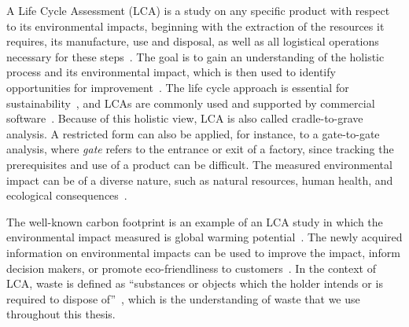     
    A Life Cycle Assessment (LCA) is a study on any specific product with respect to its environmental impacts, beginning with the extraction of the resources it requires, its manufacture, use and disposal, as well as all logistical operations necessary for these steps~\autocite{bjorn2018}.
The goal is to gain an understanding of the holistic process and its environmental impact, which is then used to identify opportunities for improvement~\autocite{graves2025}.
The life cycle approach is essential for sustainability~\autocite{graves2025}, and LCAs are commonly used and supported by commercial software~\autocite{schneider2023}.
    Because of this holistic view, LCA is also called cradle-to-grave analysis.    
    A restricted form can also be applied, for instance, to a gate-to-gate analysis, where \emph{gate} refers to the entrance or exit of a factory, since tracking the prerequisites and use of a product can be difficult.
    The measured environmental impact can be of a diverse nature, such as natural resources, human health, and ecological consequences~\autocite{huijbregts2017}.

    
    The well-known carbon footprint is an example of an LCA study in which the environmental impact measured is global warming potential~\autocite{viere2019}.
    The newly acquired information on environmental impacts can be used to improve the impact, inform decision makers, or promote eco-friendliness to customers~\autocite{iso14040}.
    In the context of LCA, waste is defined as \enquote{substances or objects which the holder intends or is required to dispose of}~\autocite{iso14040}, which is the understanding of waste that we use throughout this thesis.
    
    
    
